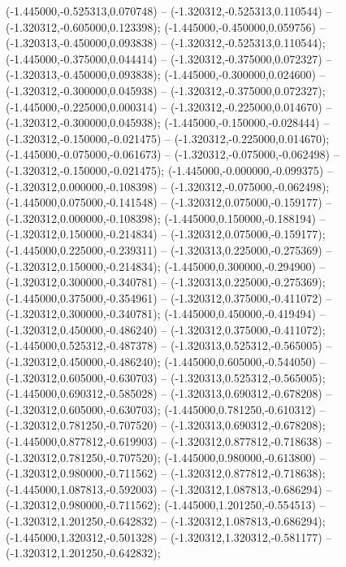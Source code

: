  (-1.445000,-0.525313,0.070748) -- (-1.320312,-0.525313,0.110544) -- (-1.320312,-0.605000,0.123398);
 (-1.445000,-0.450000,0.059756) -- (-1.320313,-0.450000,0.093838) -- (-1.320312,-0.525313,0.110544);
 (-1.445000,-0.375000,0.044414) -- (-1.320312,-0.375000,0.072327) -- (-1.320313,-0.450000,0.093838);
 (-1.445000,-0.300000,0.024600) -- (-1.320312,-0.300000,0.045938) -- (-1.320312,-0.375000,0.072327);
 (-1.445000,-0.225000,0.000314) -- (-1.320312,-0.225000,0.014670) -- (-1.320312,-0.300000,0.045938);
 (-1.445000,-0.150000,-0.028444) -- (-1.320312,-0.150000,-0.021475) -- (-1.320312,-0.225000,0.014670);
 (-1.445000,-0.075000,-0.061673) -- (-1.320312,-0.075000,-0.062498) -- (-1.320312,-0.150000,-0.021475);
 (-1.445000,-0.000000,-0.099375) -- (-1.320312,0.000000,-0.108398) -- (-1.320312,-0.075000,-0.062498);
 (-1.445000,0.075000,-0.141548) -- (-1.320312,0.075000,-0.159177) -- (-1.320312,0.000000,-0.108398);
 (-1.445000,0.150000,-0.188194) -- (-1.320312,0.150000,-0.214834) -- (-1.320312,0.075000,-0.159177);
 (-1.445000,0.225000,-0.239311) -- (-1.320313,0.225000,-0.275369) -- (-1.320312,0.150000,-0.214834);
 (-1.445000,0.300000,-0.294900) -- (-1.320312,0.300000,-0.340781) -- (-1.320313,0.225000,-0.275369);
 (-1.445000,0.375000,-0.354961) -- (-1.320312,0.375000,-0.411072) -- (-1.320312,0.300000,-0.340781);
 (-1.445000,0.450000,-0.419494) -- (-1.320312,0.450000,-0.486240) -- (-1.320312,0.375000,-0.411072);
 (-1.445000,0.525312,-0.487378) -- (-1.320313,0.525312,-0.565005) -- (-1.320312,0.450000,-0.486240);
 (-1.445000,0.605000,-0.544050) -- (-1.320312,0.605000,-0.630703) -- (-1.320313,0.525312,-0.565005);
 (-1.445000,0.690312,-0.585028) -- (-1.320313,0.690312,-0.678208) -- (-1.320312,0.605000,-0.630703);
 (-1.445000,0.781250,-0.610312) -- (-1.320312,0.781250,-0.707520) -- (-1.320313,0.690312,-0.678208);
 (-1.445000,0.877812,-0.619903) -- (-1.320312,0.877812,-0.718638) -- (-1.320312,0.781250,-0.707520);
 (-1.445000,0.980000,-0.613800) -- (-1.320312,0.980000,-0.711562) -- (-1.320312,0.877812,-0.718638);
 (-1.445000,1.087813,-0.592003) -- (-1.320312,1.087813,-0.686294) -- (-1.320312,0.980000,-0.711562);
 (-1.445000,1.201250,-0.554513) -- (-1.320312,1.201250,-0.642832) -- (-1.320312,1.087813,-0.686294);
 (-1.445000,1.320312,-0.501328) -- (-1.320312,1.320312,-0.581177) -- (-1.320312,1.201250,-0.642832);
